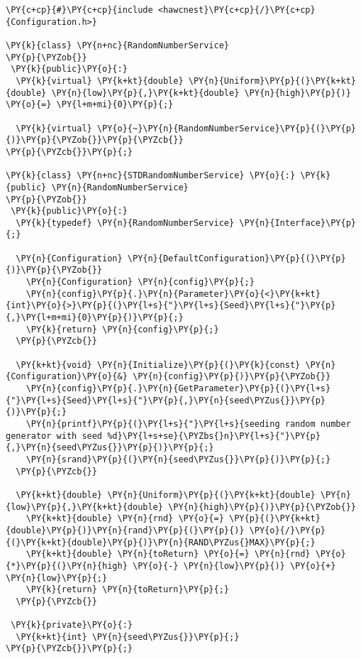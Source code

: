 \begin{Verbatim}[commandchars=\\\{\}]
\PY{c+cp}{#}\PY{c+cp}{include <hawcnest}\PY{c+cp}{/}\PY{c+cp}{Configuration.h>}

\PY{k}{class} \PY{n+nc}{RandomNumberService}
\PY{p}{\PYZob{}}
 \PY{k}{public}\PY{o}{:}
  \PY{k}{virtual} \PY{k+kt}{double} \PY{n}{Uniform}\PY{p}{(}\PY{k+kt}{double} \PY{n}{low}\PY{p}{,}\PY{k+kt}{double} \PY{n}{high}\PY{p}{)} \PY{o}{=} \PY{l+m+mi}{0}\PY{p}{;}

  \PY{k}{virtual} \PY{o}{~}\PY{n}{RandomNumberService}\PY{p}{(}\PY{p}{)}\PY{p}{\PYZob{}}\PY{p}{\PYZcb{}}
\PY{p}{\PYZcb{}}\PY{p}{;}

\PY{k}{class} \PY{n+nc}{STDRandomNumberService} \PY{o}{:} \PY{k}{public} \PY{n}{RandomNumberService}
\PY{p}{\PYZob{}}
 \PY{k}{public}\PY{o}{:}
  \PY{k}{typedef} \PY{n}{RandomNumberService} \PY{n}{Interface}\PY{p}{;}

  \PY{n}{Configuration} \PY{n}{DefaultConfiguration}\PY{p}{(}\PY{p}{)}\PY{p}{\PYZob{}}
    \PY{n}{Configuration} \PY{n}{config}\PY{p}{;}
    \PY{n}{config}\PY{p}{.}\PY{n}{Parameter}\PY{o}{<}\PY{k+kt}{int}\PY{o}{>}\PY{p}{(}\PY{l+s}{"}\PY{l+s}{Seed}\PY{l+s}{"}\PY{p}{,}\PY{l+m+mi}{0}\PY{p}{)}\PY{p}{;}
    \PY{k}{return} \PY{n}{config}\PY{p}{;}
  \PY{p}{\PYZcb{}}

  \PY{k+kt}{void} \PY{n}{Initialize}\PY{p}{(}\PY{k}{const} \PY{n}{Configuration}\PY{o}{&} \PY{n}{config}\PY{p}{)}\PY{p}{\PYZob{}}
    \PY{n}{config}\PY{p}{.}\PY{n}{GetParameter}\PY{p}{(}\PY{l+s}{"}\PY{l+s}{Seed}\PY{l+s}{"}\PY{p}{,}\PY{n}{seed\PYZus{}}\PY{p}{)}\PY{p}{;}
    \PY{n}{printf}\PY{p}{(}\PY{l+s}{"}\PY{l+s}{seeding random number generator with seed %d}\PY{l+s+se}{\PYZbs{}n}\PY{l+s}{"}\PY{p}{,}\PY{n}{seed\PYZus{}}\PY{p}{)}\PY{p}{;}
    \PY{n}{srand}\PY{p}{(}\PY{n}{seed\PYZus{}}\PY{p}{)}\PY{p}{;}
  \PY{p}{\PYZcb{}}

  \PY{k+kt}{double} \PY{n}{Uniform}\PY{p}{(}\PY{k+kt}{double} \PY{n}{low}\PY{p}{,}\PY{k+kt}{double} \PY{n}{high}\PY{p}{)}\PY{p}{\PYZob{}}
    \PY{k+kt}{double} \PY{n}{rnd} \PY{o}{=} \PY{p}{(}\PY{k+kt}{double}\PY{p}{)}\PY{n}{rand}\PY{p}{(}\PY{p}{)} \PY{o}{/}\PY{p}{(}\PY{k+kt}{double}\PY{p}{)}\PY{n}{RAND\PYZus{}MAX}\PY{p}{;}
    \PY{k+kt}{double} \PY{n}{toReturn} \PY{o}{=} \PY{n}{rnd} \PY{o}{*}\PY{p}{(}\PY{n}{high} \PY{o}{-} \PY{n}{low}\PY{p}{)} \PY{o}{+} \PY{n}{low}\PY{p}{;}
    \PY{k}{return} \PY{n}{toReturn}\PY{p}{;}
  \PY{p}{\PYZcb{}}

 \PY{k}{private}\PY{o}{:}
  \PY{k+kt}{int} \PY{n}{seed\PYZus{}}\PY{p}{;}
\PY{p}{\PYZcb{}}\PY{p}{;}
\end{Verbatim}
